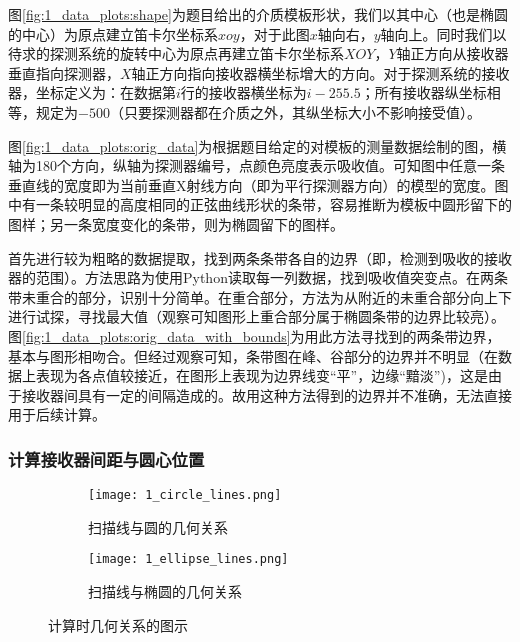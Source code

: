 图\ref{fig:1_data_plots:shape}为题目给出的介质模板形状，我们以其中心（也是椭圆的中心）为原点建立笛卡尔坐标系$xoy$，对于此图$x$轴向右，$y$轴向上。同时我们以待求的探测系统的旋转中心为原点再建立笛卡尔坐标系$XOY$，$Y$轴正方向从接收器垂直指向探测器，$X$轴正方向指向接收器横坐标增大的方向。对于探测系统的接收器，坐标定义为：在数据第$i$行的接收器横坐标为$i - 255.5$；所有接收器纵坐标相等，规定为$-500$（只要探测器都在介质之外，其纵坐标大小不影响接受值）。

图\ref{fig:1_data_plots:orig_data}为根据题目给定的对模板的测量数据绘制的图，横轴为180个方向，纵轴为探测器编号，点颜色亮度表示吸收值。可知图中任意一条垂直线的宽度即为当前垂直X射线方向（即为平行探测器方向）的模型的宽度。图中有一条较明显的高度相同的正弦曲线形状的条带，容易推断为模板中圆形留下的图样；另一条宽度变化的条带，则为椭圆留下的图样。

首先进行较为粗略的数据提取，找到两条条带各自的边界（即，检测到吸收的接收器的范围）。方法思路为使用Python读取每一列数据，找到吸收值突变点。在两条带未重合的部分，识别十分简单。在重合部分，方法为从附近的未重合部分向上下进行试探，寻找最大值（观察可知图形上重合部分属于椭圆条带的边界比较亮）。图\ref{fig:1_data_plots:orig_data_with_bounds}为用此方法寻找到的两条带边界，基本与图形相吻合。但经过观察可知，条带图在峰、谷部分的边界并不明显（在数据上表现为各点值较接近，在图形上表现为边界线变“平”，边缘“黯淡”)，这是由于接收器间具有一定的间隔造成的。故用这种方法得到的边界并不准确，无法直接用于后续计算。

\subsubsection{计算接收器间距与圆心位置}
\label{sec:1_calc_l}
\begin{figure}[htbp]
  \centering

  \begin{subfigure}[b]{0.48\textwidth}
    \texttt{[image: 1\_circle\_lines.png]}
    \caption{扫描线与圆的几何关系}
    \label{fig:1_circle_lines}
  \end{subfigure}%
  \hfill
  \begin{subfigure}[b]{0.48\textwidth}
    \texttt{[image: 1\_ellipse\_lines.png]}
    \caption{扫描线与椭圆的几何关系}
    \label{fig:1_ellipse_lines}
  \end{subfigure}%

  \caption{计算时几何关系的图示}
  \label{fig:1_geometry}
\end{figure}

